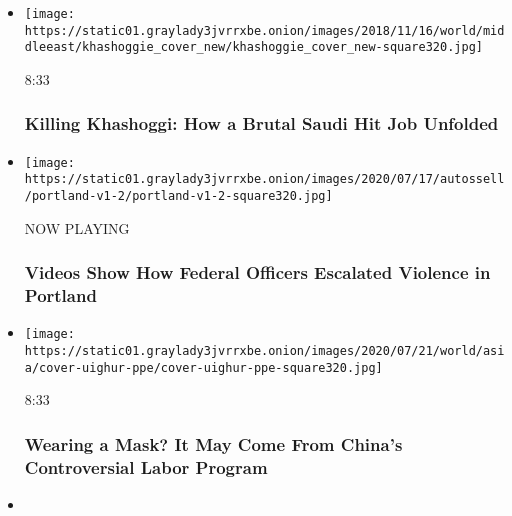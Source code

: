\begin{itemize}
\item
  \href{https://www.nytimes3xbfgragh.onion/video/world/middleeast/100000006154117/khashoggi-istanbul-death-saudi-consulate.html?action=click\&module=video-series-bar\&region=header\&pgtype=Article\&playlistId=video/investigations}{}

  \texttt{[image: https://static01.graylady3jvrrxbe.onion/images/2018/11/16/world/middleeast/khashoggie\_cover\_new/khashoggie\_cover\_new-square320.jpg]}

  8:33

  \hypertarget{killing-khashoggi-how-a-brutal-saudi-hit-job-unfolded}{%
  \subsubsection{Killing Khashoggi: How a Brutal Saudi Hit Job
  Unfolded}\label{killing-khashoggi-how-a-brutal-saudi-hit-job-unfolded}}
\item
  \texttt{[image: https://static01.graylady3jvrrxbe.onion/images/2020/07/17/autossell/portland-v1-2/portland-v1-2-square320.jpg]}

  NOW PLAYING

  \hypertarget{videos-show-how-federal-officers-escalated-violence-in-portland-2}{%
  \subsubsection{Videos Show How Federal Officers Escalated Violence in
  Portland}\label{videos-show-how-federal-officers-escalated-violence-in-portland-2}}
\item
  \href{https://www.nytimes3xbfgragh.onion/video/world/asia/100000007226041/china-coronavirus-masks-uighur-labor-ppe.html?action=click\&module=video-series-bar\&region=header\&pgtype=Article\&playlistId=video/investigations}{}

  \texttt{[image: https://static01.graylady3jvrrxbe.onion/images/2020/07/21/world/asia/cover-uighur-ppe/cover-uighur-ppe-square320.jpg]}

  8:33

  \hypertarget{wearing-a-mask-it-may-come-from-chinas-controversial-labor-program}{%
  \subsubsection{Wearing a Mask? It May Come From China's Controversial
  Labor
  Program}\label{wearing-a-mask-it-may-come-from-chinas-controversial-labor-program}}
\item
  \href{https://www.nytimes3xbfgragh.onion/video/us/100000007122997/ice-deportations-coronavirus-video.html?action=click\&module=video-series-bar\&region=header\&pgtype=Article\&playlistId=video/investigations}{}


\end{itemize}
